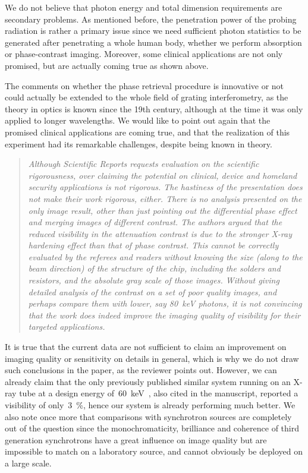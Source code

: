 \documentclass[a4paper,english]{scrartcl}
\newenvironment{reviewerquote}{\begin{quote}\itshape}{\end{quote}}
\begin{document}
We do not believe that photon energy and total dimension
requirements are secondary problems. As mentioned before, the penetration
power of the probing radiation is rather a primary issue since we need
sufficient photon statistics to be generated after penetrating a whole human
body, whether we
perform absorption or phase-contrast imaging. Moreover, some clinical
applications are not only promised, but are actually coming true as shown
above.

The comments on whether the phase
retrieval procedure is innovative or not could actually be extended to the
whole field of grating interferometry, as the theory in optics is known
since the 19th century, although at the time it was only applied to longer
wavelengths. We would like to point out again that the promised clinical
applications are coming true, and that the realization of this experiment
had its remarkable challenges, despite being known in theory.

\begin{reviewerquote}
Although Scientific Reports requests evaluation on the
scientific rigorousness, over claiming the potential on clinical, device and
homeland security applications is not rigorous. The hastiness of the
presentation does not make their work rigorous, either. There is no analysis
presented on the only image result, other than just pointing out the
differential phase effect and merging images of different contrast. The
authors argued that the reduced visibility in the attenuation contrast is
due to the stronger X-ray hardening effect than that of phase contrast. This
cannot be correctly evaluated by the referees and readers without knowing
the size (along to the beam direction) of the structure of the chip,
including the solders and resistors, and the absolute gray scale of those
images. Without giving detailed analysis of the contrast on a set of poor
quality images, and perhaps compare them with lower, say \SI{80}{\kilo\eV} photons, it
is not convincing that the work does indeed improve the imaging quality of
visibility for their targeted applications.
\end{reviewerquote}

It is true that the current data are not sufficient to claim an improvement
on imaging quality or sensitivity on details in
general, which is why we do not draw such conclusions in the paper, as the
reviewer points out. However, we can already claim that the only
previously published similar system running on an X-ray tube
at a design energy of~\SI{60}{\kilo\eV}~\cite{:/content/aip/journal/rsi/80/5/10.1063/1.3127712}, also
cited in the manuscript, reported a
visibility of only~\SI{3}{\percent}, hence our system is already performing
much better. We also note once more that comparisons with
synchrotron sources are completely out of the question since the
monochromaticity, brilliance and coherence of third generation synchrotrons
have a great influence on image quality but are impossible to match on a
laboratory source, and cannot obviously be deployed on a large scale.
\end{document}
